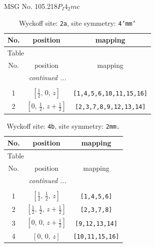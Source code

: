 \documentclass[fleqn,8pt]{jsarticle}
\begin{document}
\setcounter{MaxMatrixCols}{32}

\renewcommand{\tablename}{Table~}
\renewcommand{\figurename}{Figure~}
\begin{center}
\LARGE
MSG No. 105.218\quad$P_{I}4_{2}mc$
\end{center}
\renewcommand{\arraystretch}{1.2}
\begin{longtable}{ccc}
\caption{Wyckoff site: {\tt 2a}, site symmetry: {\tt 4'mm'}}
 \\
 \hline \hline
No. & position & mapping \\ \hline \endfirsthead

\multicolumn{2}{l}{\tablename\ \thetable{}} \\
 \hline \hline
No. & position & mapping \\ \hline \endhead

 \hline \hline
\multicolumn{2}{r}{\footnotesize\it continued ...} \\ \endfoot

 \hline \hline
\multicolumn{2}{r}{} \\ \endlastfoot

1 & $\left[ \frac{1}{2},\, 0,\, z \right]$ & {\tt [1,4,5,6,10,11,15,16]} \\ \hline
2 & $\left[ 0,\, \frac{1}{2},\, z + \frac{1}{2} \right]$ & {\tt [2,3,7,8,9,12,13,14]} \\
\end{longtable}
\renewcommand{\arraystretch}{1.2}
\begin{longtable}{ccc}
\caption{Wyckoff site: {\tt 4b}, site symmetry: {\tt 2mm.}}
 \\
 \hline \hline
No. & position & mapping \\ \hline \endfirsthead

\multicolumn{2}{l}{\tablename\ \thetable{}} \\
 \hline \hline
No. & position & mapping \\ \hline \endhead

 \hline \hline
\multicolumn{2}{r}{\footnotesize\it continued ...} \\ \endfoot

 \hline \hline
\multicolumn{2}{r}{} \\ \endlastfoot

1 & $\left[ \frac{1}{2},\, \frac{1}{2},\, z \right]$ & {\tt [1,4,5,6]} \\ \hline
2 & $\left[ \frac{1}{2},\, \frac{1}{2},\, z + \frac{1}{2} \right]$ & {\tt [2,3,7,8]} \\ \hline
3 & $\left[ 0,\, 0,\, z + \frac{1}{2} \right]$ & {\tt [9,12,13,14]} \\ \hline
4 & $\left[ 0,\, 0,\, z \right]$ & {\tt [10,11,15,16]} \\
\end{longtable}
\end{document}
